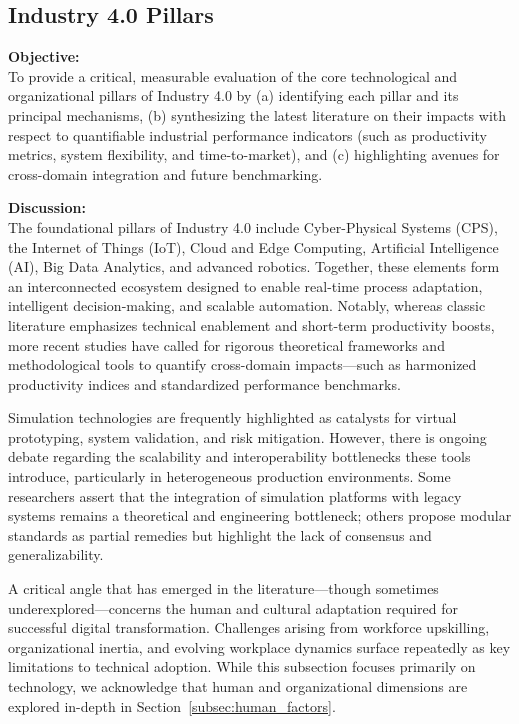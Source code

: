 \documentclass[sigconf]{acmart}
\begin{document}
\subsection{Industry 4.0 Pillars}
\textbf{Objective:}\\ 
To provide a critical, measurable evaluation of the core technological and organizational pillars of Industry 4.0 by (a) identifying each pillar and its principal mechanisms, (b) synthesizing the latest literature on their impacts with respect to quantifiable industrial performance indicators (such as productivity metrics, system flexibility, and time-to-market), and (c) highlighting avenues for cross-domain integration and future benchmarking.

\textbf{Discussion:}\\
The foundational pillars of Industry 4.0 include Cyber-Physical Systems (CPS), the Internet of Things (IoT), Cloud and Edge Computing, Artificial Intelligence (AI), Big Data Analytics, and advanced robotics. Together, these elements form an interconnected ecosystem designed to enable real-time process adaptation, intelligent decision-making, and scalable automation. Notably, whereas classic literature emphasizes technical enablement and short-term productivity boosts, more recent studies have called for rigorous theoretical frameworks and methodological tools to quantify cross-domain impacts—such as harmonized productivity indices and standardized performance benchmarks.

Simulation technologies are frequently highlighted as catalysts for virtual prototyping, system validation, and risk mitigation. However, there is ongoing debate regarding the scalability and interoperability bottlenecks these tools introduce, particularly in heterogeneous production environments. Some researchers assert that the integration of simulation platforms with legacy systems remains a theoretical and engineering bottleneck; others propose modular standards as partial remedies but highlight the lack of consensus and generalizability.

A critical angle that has emerged in the literature—though sometimes underexplored—concerns the human and cultural adaptation required for successful digital transformation. Challenges arising from workforce upskilling, organizational inertia, and evolving workplace dynamics surface repeatedly as key limitations to technical adoption. While this subsection focuses primarily on technology, we acknowledge that human and organizational dimensions are explored in-depth in Section~\ref{subsec:human_factors}.
\end{document}
